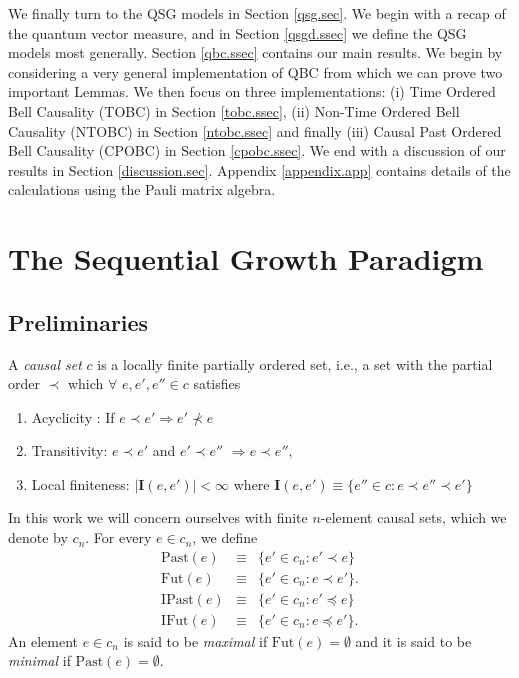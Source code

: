 \documentclass[11pt]{article}
\newcommand{\Past}{\mathrm{Past}}
\newcommand{\Fut}{\mathrm{Fut}}
\newcommand{\IPast}{\mathrm{IPast}}
\newcommand{\IFut}{\mathrm{IFut}}
\begin{document}
We finally turn to the QSG models in Section \ref{qsg.sec}. We begin
with a recap of the quantum vector measure, and in Section
\ref{qsgd.ssec}  we define the QSG models most generally. Section
\ref{qbc.ssec} contains our main results. We begin by considering a very general implementation
of QBC from which we can prove two important Lemmas. We then focus on three implementations: (i) Time
Ordered Bell Causality (TOBC) in Section \ref{tobc.ssec},  (ii) Non-Time
Ordered Bell Causality (NTOBC) in Section \ref{ntobc.ssec} and finally
(iii) Causal Past Ordered Bell Causality (CPOBC) in Section
\ref{cpobc.ssec}. We end with a discussion of our results in Section
\ref{discussion.sec}. Appendix \ref{appendix.app} contains details of the 
calculations using the Pauli matrix algebra. 


 
\section{The Sequential Growth Paradigm}
\label{secone.sec} 


\subsection{Preliminaries}
\label{prelims.ssec} 

{A {\sl causal set}   $c$  is a locally 
  finite partially  ordered set,  i.e., a set with the partial order
  $\prec$ which $\forall \, \, e,e',e'' \in c$ satisfies 
\begin{enumerate}
\item Acyclicity : If $e\prec e'\Rightarrow e' \nprec e$  
\item Transitivity:  $e\prec e'$ and $e'\prec e''$ $\Rightarrow e\prec
  e''$,  
\item Local finiteness:  $|\mathbf{I}(e,e')|<\infty$ where
  $\mathbf{I}(e,e')\equiv\{ e'' \in c:  e\prec e'' \prec e'\}$
\end{enumerate}
}

In this work we will concern ourselves with finite $n$-element causal
sets, which we denote by $c_n$. For every $e \in c_n$, we define  
\begin{eqnarray}
\Past(e)&\equiv&\{e' \in c_n: e' \prec e\}\nonumber \\ 
\Fut(e)&\equiv &\{e'\in c_n : e\prec e'\}. \nonumber \\ 
\IPast(e)&\equiv&\{e' \in c_n: e' \preceq  e\}\nonumber \\ 
\IFut(e)&\equiv &\{e'\in c_n : e\preceq e'\}. \nonumber
\end{eqnarray}
An element $e \in c_n$ is said to be {\sl maximal} if
$\Fut(e)=\emptyset$  and it is said to be {\sl minimal}
if $\Past(e)=\emptyset$. 
\end{document}
